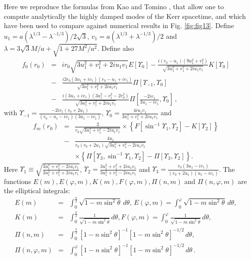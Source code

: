 \documentclass[]{iopart}
\def\beq{\begin{eqnarray}}
\def\eeq{\end{eqnarray}}
\begin{document}
\noindent
Here we reproduce the formulas from Kao and Tomino \cite{Kao:2008sv}, that
allow one to compute analytically the highly damped modes of the Kerr
spacetime, and which have been used to compare against numerical results in
Fig. \ref{fig:fig13}.
%
Define 
$u_1=a(\lambda^{1/3}- \lambda^{-1/3})/2\sqrt{3}$,
$v_1=a(\lambda^{1/3}+ \lambda^{-1/3})/2$
and
$\lambda=3\sqrt{3} M/a +\sqrt{1+27M^2/a^2}$. Define also
%
\beq
f_0(r_0) &=& i r_0 \sqrt{3u_1^2 + v_1^2 + 2i u_1 v_1} E\left[\Upsilon_0\right]-\frac{i (r_0-u_1)(9u_1^2+v_1^2)}{\sqrt{3u_1^2+v_1^2+2i u_1 v_1}} K\left[\Upsilon_0\right] \nonumber \\
%
&-& \frac{i2r_0(3u_1 + iv_1) (r_0-u_1+iv_1)}{\sqrt{3u_1^2+v_1^2+2i u_1 v_1}} \Pi\left[\Upsilon_{-1},\Upsilon_0\right] \nonumber \\
%
&-& \frac{i(3u_1+iv_1)(3u_1^2-v_1^2-2r_0^2)}{\sqrt{3u_1^2+v_1^2+2i u_1 v_1}} \Pi\left[\frac{-2iv_1}{3u_1-iv_1}, \Upsilon_0\right]\,, \label{f0D4}
\eeq
%
with $\Upsilon_{-1}=\frac{-2i
  v_1(r_0+2u_1)}{(r_0-u_1-iv_1)(3u_1-iv_1)},\,\Upsilon_0=\frac{4i u_1
  v_1}{3u_1^2+v_1^2+2i u_1 v_1}$ and
%
\beq
f_m(r_0) &=& \frac{2}{r_0 \sqrt{3u_1^2 + v_1^2 - 2i u_1 v_1}} \times 
\left\{ F\left[\sin^{-1}\Upsilon_1,\Upsilon_2 \right] - K\left[\Upsilon_2
  \right]  
\right\} \nonumber \\
%
&-& \frac{4u_1}{r_0(r_0+2u_1) \sqrt{3u_1^2 + v_1^2 - 2i u_1 v_1}} \nonumber \\
%
&&\times \left\{ \Pi\left[\Upsilon_3, \sin^{-1}
\Upsilon_1, \Upsilon_2 \right]- \Pi\left[\Upsilon_3,\Upsilon_2 \right] \right\}. \label{fmD4}
\eeq
%
Here 
%
$\Upsilon_1\equiv 
\sqrt{\frac{3u_1^2 + v_1^2 - 2i u_1 v_1}
{3u_1^2 + v_1^2 + 2i u_1 v_1}}$, 
%
$\Upsilon_2=
\frac{3u_1^2 + v_1^2 + 2i u_1 v_1}
{3u_1^2 + v_1^2 - 2i u_1 v_1}$ 
%
and 
%
$\Upsilon_3=\frac{r_0(3u_1-i v_1)}{(r_0+2u_1)(u_1-iv_1)}$.
%
The functions $E(m), E(\varphi,m), K(m), F(\varphi,m), \Pi(n,m)$ and
$\Pi(n,\varphi,m)$ are the elliptical integrals: 
%
\beq
E(m) &=& \int_0^{\frac{\pi}{2}} \sqrt{1-m\sin^2\theta} \,d\theta, \, E(\varphi,m) = \int_0^{\varphi} \sqrt{1-m\sin^2\theta} \,d\theta,\nonumber \\
K(m)&=& \int_0^{\frac{\pi}{2}} \frac{1}{\sqrt{1-m\sin^2\theta}} \,d\theta, F(\varphi,m) = \int_0^{\varphi} \frac{1}{\sqrt{1-m\sin^2\theta}} \,d\theta, \nonumber\\
\Pi(n,m)&=& \int_0^{\frac{\pi}{2}} [1-n\sin^2\theta]^{-1}[1-m\sin^2\theta]^{-1/2} \,d\theta, \nonumber\\
\Pi(n,\varphi,m)&=& \int_0^{\varphi}
[1-n\sin^2\theta]^{-1}[1-m\sin^2\theta]^{-1/2} \,d\theta\,.\nonumber \eeq
\end{document}
